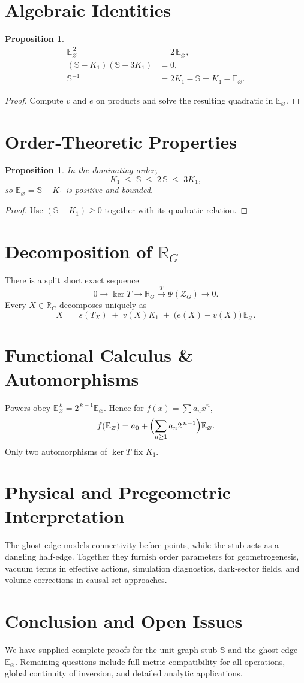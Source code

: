 \documentclass[11pt]{article}
\theoremstyle{definition}
\theoremstyle{plain}
\newtheorem{proposition}[definition]{Proposition}
\theoremstyle{remark}
\newcommand{\stub}{\mathbb S}
\newcommand{\ghost}{\mathbb E_{\varnothing}}
\begin{document}
\section{Algebraic Identities}
\begin{proposition}
\begin{align*}
  \ghost^{\,2} &= 2\,\ghost,\\[2pt]
  (\stub-K_1)(\stub-3K_1) &= 0,\\[2pt]
  \stub^{-1} &= 2K_1 - \stub = K_1 - \ghost.
\end{align*}
\end{proposition}
\begin{proof}
Compute $v$ and $e$ on products and solve the resulting quadratic in $\ghost$.
\end{proof}

\section{Order‐Theoretic Properties}
\begin{proposition}
In the dominating order,
\[
  K_1 \;\le\; \stub \;\le\; 2\,\stub \;\le\; 3K_1,
\]
so $\ghost=\stub-K_1$ is positive and bounded.
\end{proposition}
\begin{proof}
Use $(\stub-K_1)\ge0$ together with its quadratic relation.
\end{proof}

\section{Decomposition of $\mathbb R_G$}
There is a split short exact sequence
\[
  0\longrightarrow\ker T\longrightarrow \mathbb R_G \xrightarrow{\;T\;}\overline{\Psi(\mathcal Z_G)}\longrightarrow 0.
\]
Every $X\in\mathbb R_G$ decomposes uniquely as
\[
  X \;=\; s(T_X)\; +\; v(X)K_1\; +\;\bigl(e(X)-v(X)\bigr)\,\ghost.
\]

\section{Functional Calculus \& Automorphisms}
Powers obey $\ghost^{\,k} = 2^{\,k-1}\ghost$.  Hence for $f(x)=\sum a_nx^n$,
\[
  f(\ghost) = a_0 + \Bigl(\sum_{n\ge1} a_n 2^{\,n-1}\Bigr)\ghost.
\]
Only two automorphisms of $\ker T$ fix $K_1$.

\section{Physical and Pregeometric Interpretation}
The ghost edge models connectivity‐before‐points, while the stub acts as a dangling half‐edge. Together they furnish order parameters for geometrogenesis, vacuum terms in effective actions, simulation diagnostics, dark‐sector fields, and volume corrections in causal‐set approaches.

\section{Conclusion and Open Issues}
We have supplied complete proofs for the unit graph stub $\stub$ and the ghost edge $\ghost$.  Remaining questions include full metric compatibility for all operations, global continuity of inversion, and detailed analytic applications.
\end{document}
